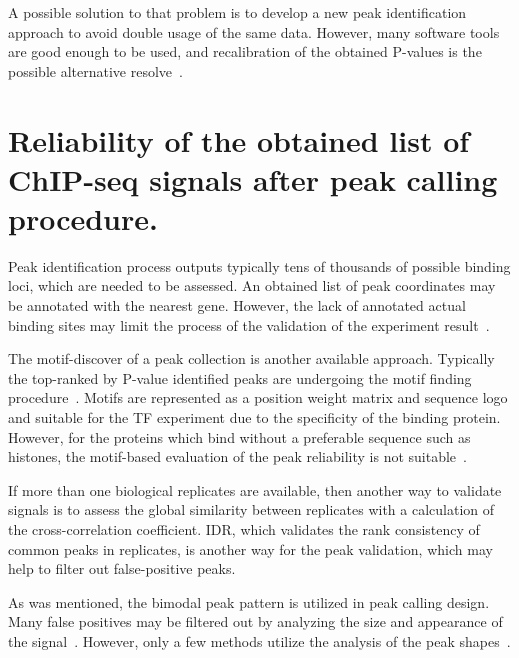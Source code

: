 A possible solution to that problem is to develop a new peak identification approach to avoid double usage of the same data. 
However, many software tools are good enough to be used, and recalibration of the obtained P-values is the possible alternative resolve~\cite{chitpin2019recap}.

\section{Reliability of the obtained list of ChIP-seq signals after peak calling procedure.}

Peak identification process outputs typically tens of thousands of possible binding loci, which are needed to be assessed. 
An obtained list of peak coordinates may be annotated with the nearest gene. 
However, the lack of annotated actual binding sites may limit the process of the validation of the experiment result~\cite{nakato2017recent}.

The motif-discover of a peak collection is another available approach. 
Typically the top-ranked by P-value identified peaks are undergoing the motif finding procedure~\cite{bailey2011dreme}.
Motifs are represented as a position weight matrix and sequence logo and suitable for the TF experiment due to the specificity of the binding protein.
However, for the proteins which bind without a preferable sequence such as histones, the motif-based evaluation of the peak reliability is not suitable~\cite{nakato2017recent}. 

If more than one biological replicates are available, then another way to validate signals is to assess the global similarity between replicates with a calculation of the cross-correlation coefficient. 
IDR, which validates the rank consistency of common peaks in replicates, is another way for the peak validation, which may help to filter out false-positive peaks. 

As  was mentioned, the bimodal peak pattern is utilized in peak calling design. 
Many false positives may be filtered out by analyzing the size and appearance of the signal~\cite{rye2011manually}. 
However, only a few methods utilize the analysis of the peak shapes~\cite{hower2011shape, wu2014polyapeak}.



